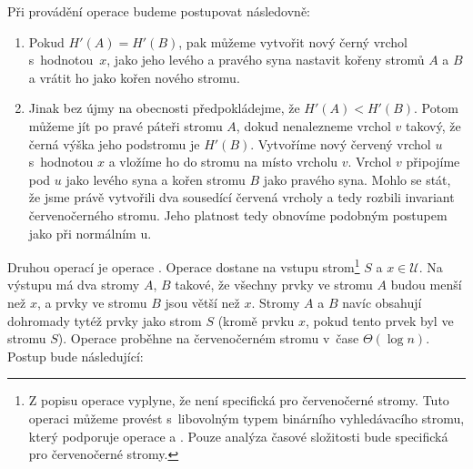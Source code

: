Při provádění operace  budeme postupovat následovně:

\begin{enumerate}
\item Pokud $H'(A) = H'(B)$, pak můžeme vytvořit nový černý vrchol s~hodnotou~$x$, jako jeho levého a pravého syna nastavit kořeny stromů $A$ a $B$ a vrátit ho jako kořen nového stromu.
\item Jinak bez újmy na obecnosti předpokládejme, že $H'(A)<H'(B)$. Potom můžeme jít po pravé páteři stromu $A$, dokud nenalezneme vrchol $v$ takový, že černá výška jeho podstromu je $H'(B)$. Vytvoříme nový červený vrchol $u$ s~hodnotou $x$ a vložíme ho do stromu na místo vrcholu $v$. Vrchol $v$ připojíme pod $u$ jako levého syna a kořen stromu $B$ jako pravého syna. Mohlo se stát, že jsme právě vytvořili dva sousedící červená vrcholy a tedy rozbili invariant červenočerného stromu. Jeho platnost tedy obnovíme podobným postupem jako při normálním u.
\end{enumerate}

Druhou operací je operace . Operace  dostane na vstupu
strom\footnote{Z popisu operace  vyplyne, že není specifická pro
červenočerné stromy. Tuto operaci můžeme provést s~libovolným typem binárního
vyhledávacího stromu, který podporuje operace  a . Pouze
analýza časové složitosti bude specifická pro červenočerné stromy.} $S$ a $x\in
\mathcal U$. Na výstupu má dva stromy $A$, $B$ takové, že všechny prvky ve
stromu $A$ budou menší než $x$, a prvky ve stromu $B$ jsou větší než $x$.
Stromy $A$ a $B$ navíc obsahují dohromady tytéž prvky jako strom $S$ (kromě
prvku $x$, pokud tento prvek byl ve stromu $S$). Operace  proběhne
na červenočerném stromu v~čase $\Theta(\log n)$. Postup bude následující:


